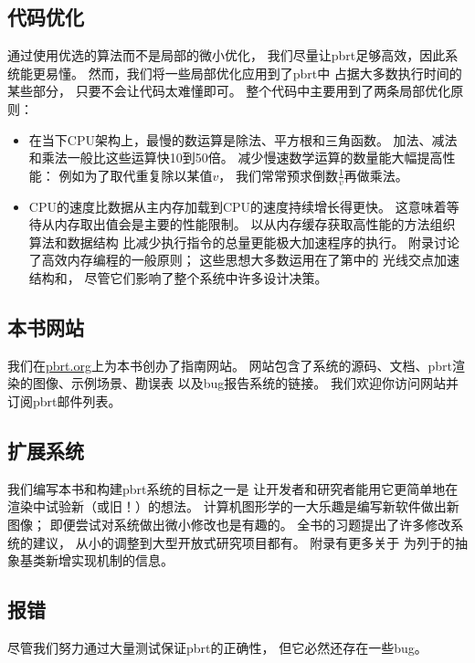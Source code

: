 \subsection{代码优化}\label{sub:代码优化}
通过使用优选的算法而不是局部的微小优化，
我们尽量让pbrt足够高效，因此系统能更易懂。
然而，我们将一些局部优化应用到了pbrt中
占据大多数执行时间的某些部分，
只要不会让代码太难懂即可。
整个代码中主要用到了两条局部优化原则：
\begin{itemize}
    \item 在当下CPU架构上，最慢的数运算是除法、平方根和三角函数。
          加法、减法和乘法一般比这些运算快10到50倍。
          减少慢速数学运算的数量能大幅提高性能：
          例如为了取代重复除以某值$v$，
          我们常常预求倒数$\displaystyle\frac{1}{v}$再做乘法。
    \item CPU的速度比数据从主内存加载到CPU的速度持续增长得更快。
          这意味着等待从内存取出值会是主要的性能限制。
          以从内存缓存获取高性能的方法组织算法和数据结构
          比减少执行指令的总量更能极大加速程序的执行。
          附录讨论了高效内存编程的一般原则；
          这些思想大多数运用在了第中的
          光线交点加速结构和，
          尽管它们影响了整个系统中许多设计决策。
\end{itemize}

\subsection{本书网站}\label{sub:本书网站}
我们在\href{https://pbrt.org/}{\ttfamily pbrt.org}上为本书创办了指南网站。
网站包含了系统的源码、文档、pbrt渲染的图像、示例场景、勘误表
以及bug报告系统的链接。
我们欢迎你访问网站并订阅pbrt邮件列表。

\subsection{扩展系统}\label{sub:扩展系统}
我们编写本书和构建pbrt系统的目标之一是
让开发者和研究者能用它更简单地在渲染中试验新（或旧！）的想法。
计算机图形学的一大乐趣是编写新软件做出新图像；
即便尝试对系统做出微小修改也是有趣的。
全书的习题提出了许多修改系统的建议，
从小的调整到大型开放式研究项目都有。
附录有更多关于
为列于的抽象基类新增实现机制的信息。

\subsection{报错}\label{sub:报错}
尽管我们努力通过大量测试保证pbrt的正确性，
但它必然还存在一些bug。

